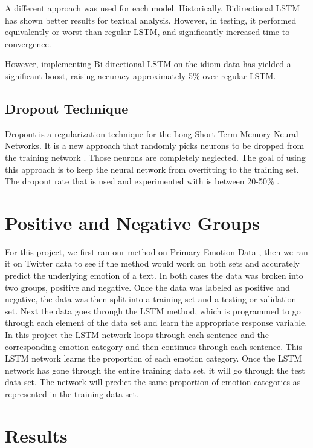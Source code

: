 \documentclass[titlepage,letterpaper]{article}
\begin{document}
A different approach was used for each model. Historically, Bidirectional LSTM has shown better results for textual analysis. However, in testing, it performed equivalently or worst than regular LSTM, and significantly increased time to convergence.

However, implementing Bi-directional LSTM on the idiom data has yielded a significant boost, raising accuracy approximately 5\% over regular LSTM.

\subsection{Dropout Technique}
Dropout is a regularization technique for the Long Short Term Memory Neural Networks. It is a new approach that randomly picks neurons to be dropped from the training network \cite{nielsen2015neural}. Those neurons are completely neglected. The goal of using this approach is to keep the neural network from overfitting to the training set. The dropout rate that is used and experimented with is between 20-50\% \cite{nielsen2015neural}.

\section{Positive and Negative Groups}

For this project, we first ran our method on Primary Emotion Data \cite{lowriwilliams}, then we ran it on Twitter data to see if the method would work on both sets and accurately predict the underlying emotion of a text. In both cases the data was broken into two groups, positive and negative. Once the data was labeled as positive and negative, the data was then split into a training set and a testing or validation set. Next the data goes through the LSTM method, which is programmed to go through each element of the data set and learn the appropriate response variable. In this project the LSTM network loops through each sentence and the corresponding emotion category and then continues through each sentence. This LSTM network learns the proportion of each emotion category. Once the LSTM network has gone through the entire training data set, it will go through the test data set. The network will predict the same proportion of emotion categories as represented in the training data set. 

\section{Results}
\end{document}
